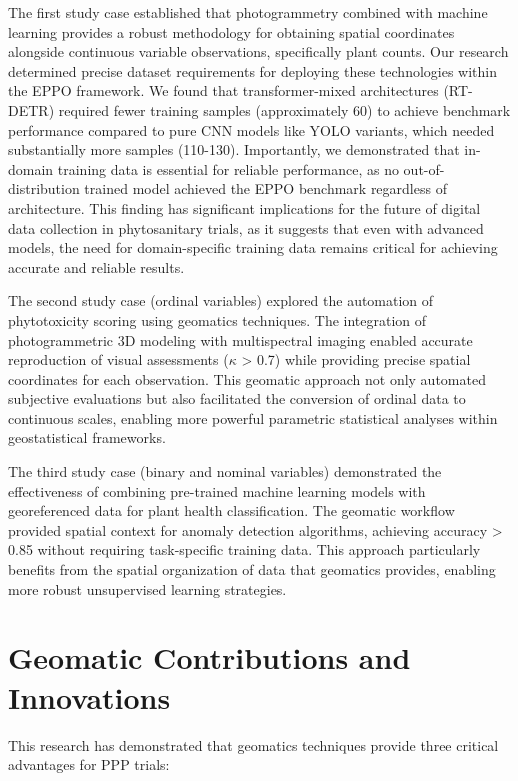 \documentclass[12pt,a4paper,oneside]{report}
\begin{document}
The first study case established that photogrammetry combined with machine learning 
provides a robust methodology for obtaining spatial coordinates alongside continuous 
variable observations, specifically plant counts. Our research determined precise 
dataset requirements for deploying these technologies within the EPPO framework. 
We found that transformer-mixed architectures (RT-DETR) required fewer training samples 
(approximately 60) to achieve benchmark performance compared to pure CNN models like YOLO 
variants, which needed substantially more samples (110-130). Importantly, we demonstrated that in-domain training 
data is essential for reliable performance, as no out-of-distribution trained model 
achieved the EPPO benchmark regardless of architecture. This finding has significant 
implications for the future of digital data collection in phytosanitary trials, as it
suggests that even with advanced models, the need for domain-specific training data
remains critical for achieving accurate and reliable results.

The second study case (ordinal variables) explored the automation of phytotoxicity scoring using geomatics techniques. The integration of photogrammetric 3D modeling with multispectral imaging enabled accurate reproduction of visual assessments ($\kappa$ > 0.7) while providing precise spatial coordinates for each observation. This geomatic approach not only automated subjective evaluations but also facilitated the conversion of ordinal data to continuous scales, enabling more powerful parametric statistical analyses within geostatistical frameworks.

The third study case (binary and nominal variables) demonstrated the effectiveness of combining pre-trained machine learning models with georeferenced data for plant health classification. The geomatic workflow provided spatial context for anomaly detection algorithms, achieving accuracy > 0.85 without requiring task-specific training data. This approach particularly benefits from the spatial organization of data that geomatics provides, enabling more robust unsupervised learning strategies.

\section{Geomatic Contributions and Innovations}

This research has demonstrated that geomatics techniques provide three critical advantages for PPP trials:
\end{document}
